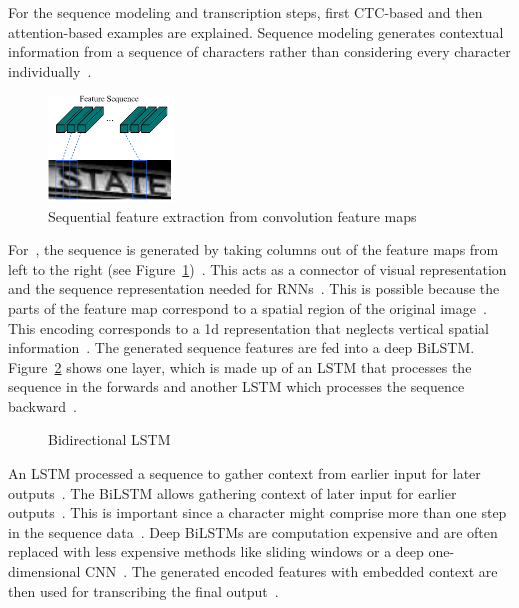 For the sequence modeling and transcription steps, first \ac{CTC}-based
and then attention-based examples are explained.
Sequence modeling generates contextual information from a sequence of characters rather
than considering every character individually~\citep{chen_text_2021}.
\begin{figure}[h]
    \centering
    \includegraphics[width=0.3\textwidth]{img/STR-encdec-sequence-feat.png}
    \caption[Sequential feature extraction from convolution feature maps]{%
        Sequential feature extraction from convolution feature
        maps~\citep{shi_end--end_2017}\label{fig:STR-CTC-seq-feat}
    }
\end{figure}
For~\cite{shi_end--end_2017}, the sequence is generated by taking columns out of the feature maps
from left to the right (see Figure~\ref{fig:STR-CTC-seq-feat})~\citep{shi_end--end_2017}.
This acts as a connector of visual representation and the sequence representation
needed for \acp{RNN}~\citep{chen_text_2021}.
This is possible because the parts of the feature map correspond to a spatial region of the
original image~\citep{shi_end--end_2017,goodfellow_deep_2016}.
This encoding corresponds to a 1d representation that neglects vertical spatial
information~\citep{cong_comparative_2019}.
The generated sequence features are fed into a deep \ac{BiLSTM}.
Figure~\ref{fig:bilstm} shows one layer, which is made up of an \ac{LSTM} that processes the
sequence in the forwards and another \ac{LSTM} which processes the sequence
backward~\citep{shi_end--end_2017}.
\begin{figure}[ht]
    \centering
    \caption[Bidirectional LSTM]{%
        Bidirectional LSTM~\citep{goodfellow_deep_2016}\label{fig:bilstm}
    }
\end{figure}
An \ac{LSTM} processed a sequence to gather context from earlier input for later
outputs~\citep{shi_end--end_2017,goodfellow_deep_2016}.
The \ac{BiLSTM} allows gathering context of later input for earlier outputs~\citep{shi_end--end_2017}.
This is important since a character might comprise more than one step in the sequence
data~\citep{shi_end--end_2017}.
Deep \acp{BiLSTM} are computation expensive and are often replaced with less expensive
methods like sliding windows or a deep one-dimensional \ac{CNN}~\citep{chen_text_2021}.
The generated encoded features with embedded context are then used for transcribing the final
output~\citep{shi_end--end_2017}.

